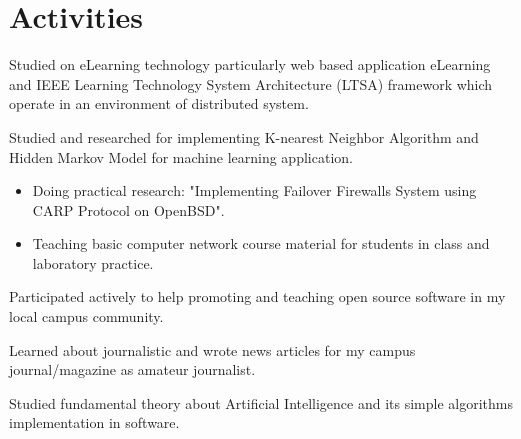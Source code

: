 \documentclass[10pt, a4paper]{moderncv}
\begin{document}
\section{Activities}
{
    \begin{scriptsize}
        Studied on eLearning technology particularly web based application eLearning and IEEE Learning Technology System Architecture (LTSA) framework
        which operate in an environment of distributed system.
    \end{scriptsize}
}
{
    \begin{scriptsize}
        Studied and researched for implementing K-nearest Neighbor Algorithm and Hidden Markov Model for machine learning application. 
    \end{scriptsize}
}
{
    \begin{itemize}
        \item Doing practical research: "Implementing Failover Firewalls System using CARP Protocol on OpenBSD". 
        \item Teaching basic computer network course material for students in class and laboratory practice.
    \end{itemize}
}
{
    \begin{scriptsize}
        Participated actively to help promoting and teaching open source software in my local campus community.
    \end{scriptsize}
}
{
    \begin{scriptsize}
        Learned about journalistic and wrote news articles for my campus journal/magazine as amateur journalist.
    \end{scriptsize}
}
{
    \begin{scriptsize}
        Studied fundamental theory about Artificial Intelligence and its simple algorithms implementation in software.
    \end{scriptsize}
}
\end{document}
